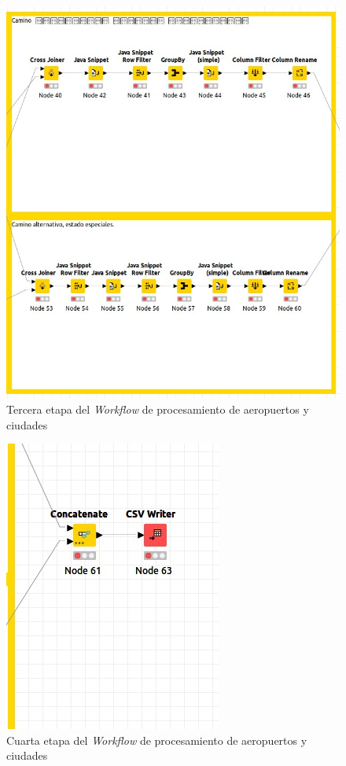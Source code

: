 \documentclass{article}
\begin{document}
\begin{landscape}
\begin{figure}
        \includegraphics[scale=0.5]{images/workflow_ciudades_3.jpeg}
        \caption{Tercera etapa del \textit{Workflow} de procesamiento de aeropuertos y ciudades}
        \label{fig:workflow_aeropuertos_ciudades_3}
    \end{figure}
    \newpage
    \begin{figure}
        \centering
        \includegraphics[scale=0.5]{images/workflow_ciudades_4.jpeg}
        \caption{Cuarta etapa del \textit{Workflow} de procesamiento de aeropuertos y ciudades}
        \label{fig:workflow_aeropuertos_ciudades_4}
    \end{figure}
\end{landscape}
\end{document}
